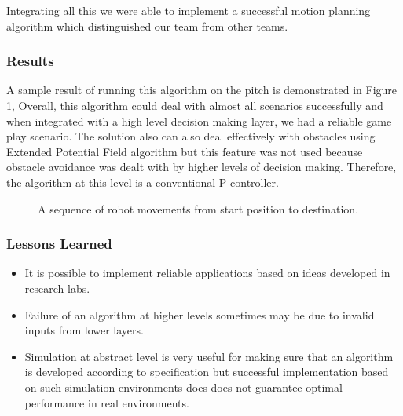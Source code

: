Integrating all this we were able to implement a successful motion planning algorithm which distinguished our team from other teams.\linebreak

\subsubsection{Results}
A sample result of running this algorithm on the pitch is demonstrated in Figure \ref{fig:seq}, Overall, this algorithm could deal with almost all scenarios successfully and when integrated with a high level decision making layer, we had a reliable game play scenario. 
The solution also can also deal effectively with obstacles using Extended Potential Field algorithm\cite{paper:OKhatib} but this feature was not used because obstacle avoidance was dealt with by higher levels of decision making. Therefore, the algorithm at this level is a conventional P controller.  

\begin{figure}[!bp]
\begin{center}
\caption{A sequence of robot movements from start position to destination.}
\label{fig:seq}
\end{center}
\end{figure}

\subsubsection{Lessons Learned}

\begin{itemize}
\item It is possible to implement reliable applications based on ideas developed in research labs. 
\item Failure of an algorithm at higher levels sometimes may be due to invalid inputs from lower layers.
\item Simulation at abstract level is very useful for making sure that an algorithm is developed according to specification but successful implementation based on such simulation environments does does not guarantee optimal performance in real environments.
\end{itemize}
